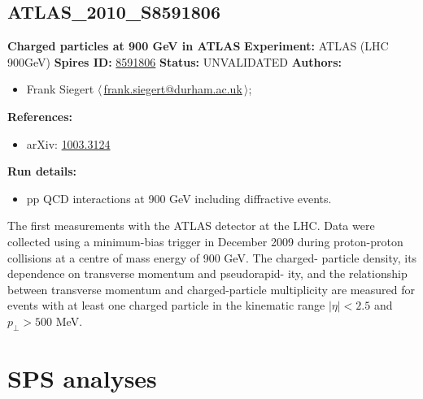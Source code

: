 \subsection[ATLAS\_2010\_S8591806]{ATLAS\_2010\_S8591806\,\cite{Collaboration:2010rd}}
\textbf{Charged particles at 900 GeV in ATLAS}\newline
\textbf{Experiment:} ATLAS (LHC 900GeV) \newline
\textbf{Spires ID:} \href{http://www.slac.stanford.edu/spires/find/hep/www?rawcmd=key+8591806}{8591806}\newline
\textbf{Status:} UNVALIDATED\newline
\textbf{Authors:}
\begin{itemize}
  \item Frank Siegert $\langle\,$\href{mailto:frank.siegert@durham.ac.uk}{frank.siegert@durham.ac.uk}$\,\rangle$;
\end{itemize}
\textbf{References:}
\begin{itemize}
  \item arXiv: \href{http://arxiv.org/abs/1003.3124}{1003.3124}
\end{itemize}
\textbf{Run details:}
\begin{itemize}

  \item pp QCD interactions at 900 GeV including diffractive events.\end{itemize}

\noindent The ﬁrst measurements with the ATLAS detector at the LHC. Data were collected using a minimum-bias trigger in December 2009 during proton-proton collisions at a centre of mass energy of 900 GeV. The charged- particle density, its dependence on transverse momentum and pseudorapid- ity, and the relationship between transverse momentum and charged-particle multiplicity are measured for events with at least one charged particle in the kinematic range $|\eta| < 2.5$ and $p_\perp > 500$ MeV.

\clearpage


\section{SPS analyses}
